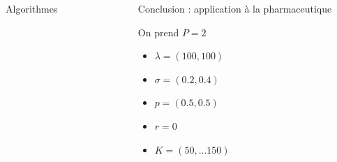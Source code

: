 \documentclass[final]{beamer}
\newlength{\sepwid}
\newlength{\onecolwid}
\newlength{\twocolwid}
\begin{document}
\begin{frame}[t]
\begin{columns}[t]
\begin{column}{\twocolwid}
\begin{alertblock}{Algorithmes}
\begin{columns}[t,totalwidth=0.45\paperwidth]
\begin{column}{\onecolwid}

\end{column} %

\end{columns} %

\end{alertblock}

\end{column} %

\begin{column}{\sepwid}\end{column} %


\begin{column}{\onecolwid} %


\begin{block}{Conclusion : application à la pharmaceutique}
  \begin{minipage}{0.49\textwidth}
    On prend $P = 2$
    \begin{itemize}
      \item $\lambda = (100,100)$
      \item $\sigma = (0.2, 0.4)$
      \item $p = (0.5,0.5) $
      \item $r = 0$
      \item $K = (50,...150)$
    \end{itemize}
  \end{minipage}


\end{block}
\end{column}
\end{columns}
\end{frame}
\end{document}
